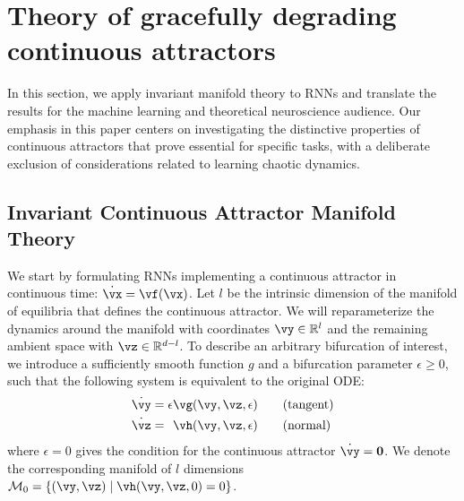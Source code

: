 \documentclass{article} %
\newcounter{ct}
\newcommand{\reals}{\mathbb{R}}
\newcommand{\manifold}{\mathcal{M}}
\theoremstyle{definition}
\theoremstyle{remark}
\begin{document}

\section{Theory of gracefully degrading continuous attractors}\label{sec:theory}
In this section, we apply invariant manifold theory to RNNs and translate the results for the machine learning and theoretical neuroscience audience. Our emphasis in this paper centers on investigating the distinctive properties of continuous attractors that prove essential for specific tasks, with a deliberate exclusion of considerations related to learning chaotic dynamics.



\subsection{Invariant Continuous Attractor Manifold Theory}\label{sec:imt}
We start by formulating RNNs implementing a continuous attractor in continuous time: $\dot{\vx} = \vf(\vx)$.
Let $l$ be the intrinsic dimension of the manifold of equilibria that defines the continuous attractor.
We will reparameterize the dynamics around the manifold with coordinates $\vy \in \reals^l$ and the remaining ambient space with $\vz \in \reals^{d-l}$.
To describe an arbitrary bifurcation of interest, we introduce a sufficiently smooth function $g$ and a bifurcation parameter $\epsilon \geq 0$, such that the following system is equivalent to the original ODE:
\begin{align}\label{eq:fenichel:flow}
    \dot{\vy} &=           \epsilon  \vg(\vy, \vz, \epsilon) \qquad \text{(tangent)}\\
    \dot{\vz} &= \hphantom{\epsilon} \vh(\vy, \vz, \epsilon) \qquad \text{(normal)}
\end{align}
where $\epsilon = 0$ gives the condition for the continuous attractor $\dot{\vy} = \mathbf{0}$.
We denote the corresponding manifold of $l$ dimensions $\manifold_0 = \{(\vy,\vz) \mid \vh(\vy,\vz,0) = 0\}$.
\end{document}
